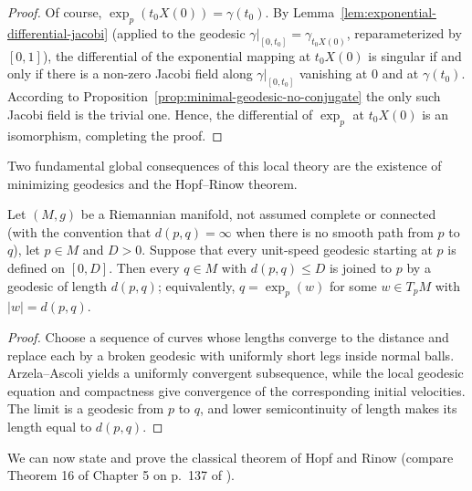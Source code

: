 \begin{proof}
\sketch
{}
Of course, $\exp_p(t_0X(0))=\gamma(t_0)$. By
Lemma~\ref{lem:exponential-differential-jacobi} (applied to the
geodesic $\gamma|_{[0,t_0]}=\gamma_{t_0X(0)}$, reparameterized by
$[0,1]$), the differential of the
exponential mapping at $t_0X(0)$ is singular if and only if there
is a non-zero
Jacobi field along $\gamma|_{[0,t_0]}$ vanishing at $0$ and at
$\gamma(t_0)$. According
to  Proposition~\ref{prop:minimal-geodesic-no-conjugate} the only such Jacobi field is the
trivial one. Hence, the differential of $\exp_p$ at $t_0X(0)$
is an isomorphism, completing the proof.
\end{proof}

Two fundamental global consequences of this local theory are the
existence of minimizing geodesics and the Hopf--Rinow theorem.

\begin{lemma}
\label{lem:minimizing-geodesic-exists}


Let $(M,g)$ be a Riemannian manifold, not assumed complete or
connected (with the convention that $d(p,q)=\infty$ when there is
no smooth path from $p$ to $q$), let $p\in M$ and $D>0$. Suppose
that every unit-speed
geodesic starting at $p$ is defined on $[0,D]$. Then every $q\in
M$ with $d(p,q)\le D$ is joined to $p$ by a geodesic of length
$d(p,q)$; equivalently, $q=\exp_p(w)$ for some $w\in T_pM$ with
$|w|=d(p,q)$.
\end{lemma}

\begin{proof}
\sketch
{}
Choose a sequence of curves whose lengths converge to the distance and replace each by a broken geodesic with uniformly short legs inside normal balls. Arzela--Ascoli yields a uniformly convergent subsequence, while the local geodesic equation and compactness give convergence of the corresponding initial velocities. The limit is a geodesic from $p$ to $q$, and lower semicontinuity of length makes its length equal to $d(p,q)$.
\end{proof}

We can now state and prove the classical theorem of Hopf and Rinow
(compare Theorem 16 of Chapter 5 on p.~137 of \cite{Petersen}).

